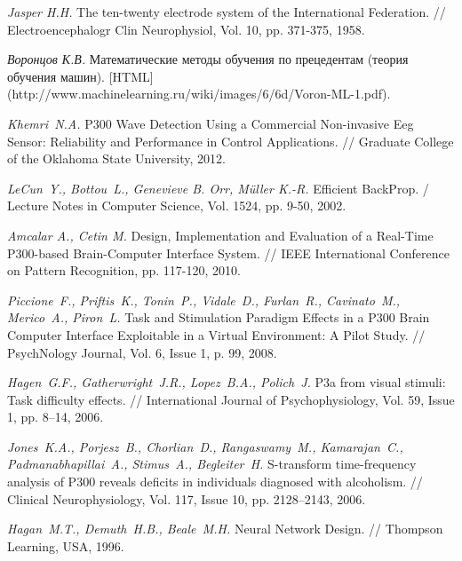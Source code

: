 \documentclass[12pt,a4paper,oneside,fleqn,leqno]{article}
\newcounter{pe} %
\begin{document}
\begin{thebibliography}{1}
{\it Jasper H.H.} The ten-twenty electrode system of the International Federation. // Electroencephalogr Clin Neurophysiol, Vol. 10, pp. 371-375, 1958.

    {\it Воронцов К.В.} Математические методы обучения по прецедентам (теория обучения машин).
   [HTML] (http://www.machinelearning.ru/wiki/images/6/6d/Voron-ML-1.pdf).

	{\it Khemri~N.A.} P300 Wave Detection Using a Commercial Non-invasive Eeg Sensor: Reliability and Performance in Control Applications. // Graduate College of the Oklahoma State University, 2012.

	{\it LeCun~Y., Bottou~L., Genevieve B. Orr, Müller K.-R.} Efficient BackProp. / Lecture Notes in Computer Science, Vol. 1524, pp. 9-50, 2002.

{\it Amcalar A., Cetin M.} Design, Implementation and Evaluation of a Real-Time P300-based Brain-Computer Interface System. // IEEE International Conference on Pattern Recognition, pp. 117-120, 2010.

{\it Piccione~F., Priftis~K., Tonin~P., Vidale~D., Furlan~R., Cavinato~M., Merico~A., Piron~L.} Task and Stimulation Paradigm Effects in a P300 Brain Computer Interface Exploitable in a Virtual Environment: A Pilot Study. // PsychNology Journal, Vol. 6, Issue 1, p. 99, 2008.

{\it Hagen~G.F., Gatherwright~J.R., Lopez~B.A., Polich~J.} P3a from visual stimuli: Task difficulty effects. // International Journal of Psychophysiology, Vol. 59, Issue 1, pp. 8–14, 2006.

{\it Jones~K.A., Porjesz~B., Chorlian~D., Rangaswamy~M., Kamarajan~C., Padmanabhapillai~A., Stimus~A., Begleiter~H.} S-transform time-frequency analysis of P300 reveals deficits in individuals diagnosed with alcoholism. // Clinical Neurophysiology, Vol. 117, Issue 10, pp. 2128–2143, 2006.

{\it Hagan~M.T., Demuth~H.B., Beale~M.H.} Neural Network Design. // Thompson Learning, USA, 1996.


\end{thebibliography}
\end{document}
